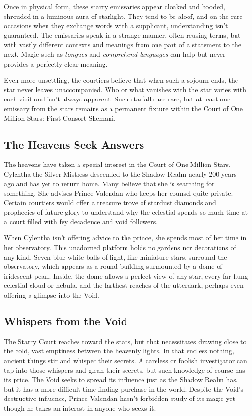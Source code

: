 \documentclass[10pt,a4paper,twoside,bg=print,twocolumn,openany,nodeprecatedcode]{dndbook}
\begin{document}
Once in physical form, these starry emissaries appear cloaked and hooded, shrouded in a luminous aura of starlight. They tend to be aloof, and on the rare occasions when they exchange words with a supplicant, understanding isn't guaranteed. The emissaries speak in a strange manner, often reusing terms, but with vastly different contexts and meanings from one part of a statement to the next. Magic such as \textit{tongues} and \textit{comprehend languages} can help but never provides a perfectly clear meaning.

Even more unsettling, the courtiers believe that when such a sojourn ends, the star never leaves unaccompanied. Who or what vanishes with the star varies with each visit and isn't always apparent. Such starfalls are rare, but at least one emissary from the stars remains as a permanent fixture within the Court of One Million Stars: First Consort Shemani.

\subsection{The Heavens Seek Answers}
The heavens have taken a special interest in the Court of One Million Stars. Cylentha the Silver Mistress descended to the Shadow Realm nearly 200 years ago and has yet to return home. Many believe that she is searching for something. She advises Prince Valendan who keeps her counsel quite private. Certain courtiers would offer a treasure trove of stardust diamonds and prophecies of future glory to understand why the celestial spends so much time at a court filled with fey decadence and void followers.

When Cylentha isn't offering advice to the prince, she spends most of her time in her observatory. This unadorned platform holds no gardens nor decorations of any kind. Seven blue-white balls of light, like miniature stars, surround the observatory, which appears as a round building surmounted by a dome of iridescent pearl. Inside, the dome allows a perfect view of any star, every far-flung celestial cloud or nebula, and the farthest reaches of the utterdark, perhaps even offering a glimpse into the Void.

\subsection{Whispers from the Void}
The Starry Court reaches toward the stars, but that necessitates drawing close to the cold, vast emptiness between the heavenly lights. In that endless nothing, ancient things stir and whisper their secrets. A careless or foolish investigator can tap into those whispers and glean their secrets, but such knowledge of course has its price. The Void seeks to spread its influence just as the Shadow Realm has, but it has a more difficult time finding purchase in the world. Despite the Void's destructive influence, Prince Valendan hasn't forbidden study of its magic yet, though he takes an interest in anyone who seeks it.
\end{document}

